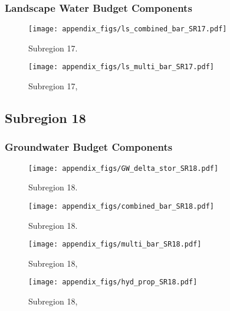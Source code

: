 \subsubsection{Landscape Water Budget Components}
\begin{figure}[ht]
\centerline{\texttt{[image: appendix\_figs/ls\_combined\_bar\_SR17.pdf]}}
\caption{\LSCombinedTextOne Subregion 17.\LSCombinedTextTwo}
\label{fig:LS_budget_SR17}
\end{figure}
\newpage

\begin{landscape}
\begin{figure}[ht]
\centerline{\texttt{[image: appendix\_figs/ls\_multi\_bar\_SR17.pdf]}}
\caption{\LSMultiTextOne Subregion 17,\LSMultiTextTwo}
\label{fig:multi_LS_budget_SR17}
\end{figure}
\newpage
\end{landscape}

\subsection{Subregion 18}
\subsubsection{Groundwater Budget Components}
\begin{figure}[h]
\centerline{\texttt{[image: appendix\_figs/GW\_delta\_stor\_SR18.pdf]}}
\caption{\GWBudgetText Subregion 18.}
\label{fig:delta_stor_SR18}
\end{figure}
\newpage

\begin{figure}[ht]
\centerline{\texttt{[image: appendix\_figs/combined\_bar\_SR18.pdf]}}
\caption{\GWCombinedTextOne Subregion 18.\GWCombinedTextTwo}
\label{fig:GW_budget_SR18}
\end{figure}
\newpage

\begin{landscape}
\begin{figure}[ht]
\centerline{\texttt{[image: appendix\_figs/multi\_bar\_SR18.pdf]}}
\caption{\GWMultiTextOne Subregion 18,\GWMultiTextTwo}
\label{fig:multi_GW_budget_SR18}
\end{figure}
\newpage

\begin{figure}[ht]
\centerline{\texttt{[image: appendix\_figs/hyd\_prop\_SR18.pdf]}}
\caption{\HydPropOne Subregion 18,\HydPropTwo}
\label{fig:hyd_prop_SR18}
\end{figure}
\newpage
\end{landscape}

